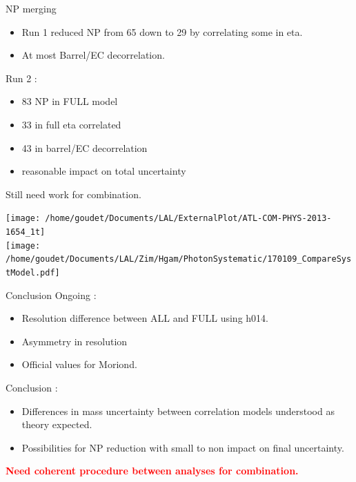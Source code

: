 \documentclass[a4paper]{beamer}
\begin{document}
  \begin{frame}{NP merging}

    \begin{minipage}{0.49\linewidth}
      \begin{itemize}
      \item Run 1 reduced NP from 65 down to 29 by correlating some in eta.
      \item At most Barrel/EC decorrelation.
      \end{itemize}
      Run 2 :
      \begin{itemize}
      \item 83 NP in FULL model
      \item 33 in full eta correlated
      \item 43 in barrel/EC decorrelation
      \item reasonable impact on total uncertainty
      \end{itemize}
      Still need work for combination.
    \end{minipage}
    \hfill
    \begin{minipage}{0.49\linewidth}
      \texttt{[image: /home/goudet/Documents/LAL/ExternalPlot/ATL-COM-PHYS-2013-1654\_1t]}\\
      \texttt{[image: /home/goudet/Documents/LAL/Zim/Hgam/PhotonSystematic/170109\_CompareSystModel.pdf]}\\
    \end{minipage}
    
  \end{frame}
  \begin{frame}{Conclusion}
    Ongoing :
    \begin{itemize}
    \item Resolution difference between ALL and FULL using h014.
    \item Asymmetry in resolution
    \item Official values for Moriond.
    \end{itemize}
    \vfill
    Conclusion :
    \begin{itemize}
    \item Differences in mass uncertainty between correlation models understood as theory expected.
    \item Possibilities for NP reduction with small to non impact on final uncertainty.
    \end{itemize}
    
    \textcolor{red}{\bf Need coherent procedure between analyses for combination.}

  \end{frame}
\begin{frame}
\maketitle
\end{frame}
\appendix

\end{document}
